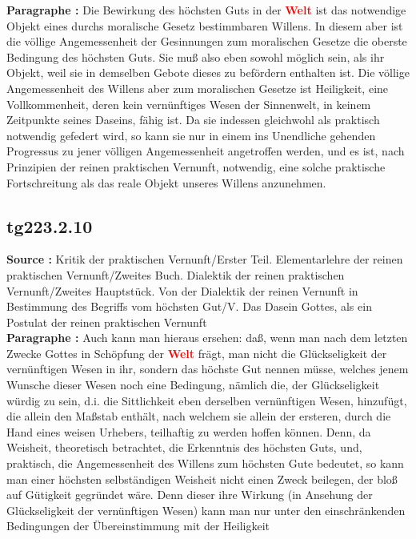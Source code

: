 \documentclass[a4paper,12pt,twoside]{book}
\newcommand{\match}[1]{\textcolor{red}{\textbf{#1}}}
\begin{document}
	\noindent\textbf{Paragraphe : }Die Bewirkung des höchsten Guts in der \match{Welt} ist das notwendige Objekt eines durchs moralische Gesetz bestimmbaren Willens. In diesem aber ist die völlige Angemessenheit der Gesinnungen zum moralischen Gesetze die oberste Bedingung des höchsten Guts. Sie muß also eben sowohl möglich sein, als ihr Objekt, weil sie in demselben Gebote dieses zu befördern enthalten ist. Die völlige Angemessenheit des Willens aber zum moralischen Gesetze ist Heiligkeit, eine Vollkommenheit, deren kein vernünftiges Wesen der Sinnenwelt, in keinem Zeitpunkte seines Daseins, fähig ist. Da sie indessen gleichwohl als praktisch notwendig gefedert wird, so kann sie nur in einem ins Unendliche gehenden Progressus zu jener völligen Angemessenheit angetroffen werden, und es ist, nach Prinzipien der reinen praktischen Vernunft, notwendig, eine solche praktische Fortschreitung als das reale Objekt unseres Willens anzunehmen. 
	
	\subsection*{tg223.2.10} 
	\textbf{Source : }Kritik der praktischen Vernunft/Erster Teil. Elementarlehre der reinen praktischen Vernunft/Zweites Buch. Dialektik der reinen praktischen Vernunft/Zweites Hauptstück. Von der Dialektik der reinen Vernunft in Bestimmung des Begriffs vom höchsten Gut/V. Das Dasein Gottes, als ein Postulat der reinen praktischen Vernunft\\  
	
	\noindent\textbf{Paragraphe : }Auch kann man hieraus ersehen: daß, wenn man nach dem letzten Zwecke Gottes in Schöpfung der \match{Welt} frägt, man nicht die Glückseligkeit der vernünftigen Wesen in ihr, sondern das höchste Gut nennen müsse, welches jenem Wunsche dieser Wesen noch eine Bedingung, nämlich die, der Glückseligkeit würdig zu sein, d.i. die Sittlichkeit eben derselben vernünftigen Wesen, hinzufügt, die allein den Maßstab enthält, nach welchem sie allein der ersteren, durch die Hand eines weisen Urhebers, teilhaftig zu werden hoffen können. Denn, da Weisheit, theoretisch betrachtet, die Erkenntnis des höchsten Guts, und, praktisch, die Angemessenheit des Willens zum höchsten Gute bedeutet, so kann man einer höchsten selbständigen Weisheit nicht einen Zweck beilegen, der bloß auf Gütigkeit gegründet wäre. Denn dieser ihre Wirkung (in Ansehung der Glückseligkeit der vernünftigen Wesen)  kann man nur unter den einschränkenden Bedingungen der Übereinstimmung mit der Heiligkeit
	
\end{document}
